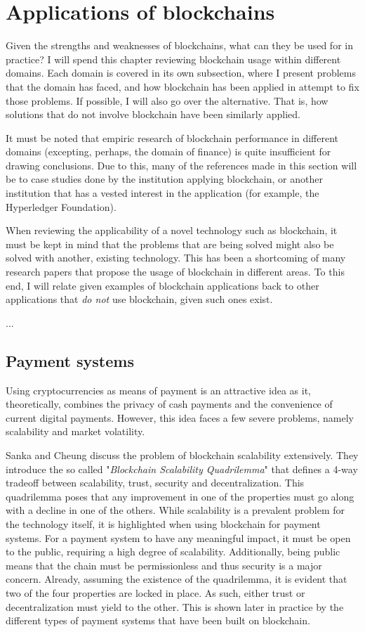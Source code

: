 \section{Applications of blockchains}

Given the strengths and weaknesses of blockchains, what can they be
used for in practice? I will spend this chapter reviewing blockchain
usage within different domains. Each domain is covered in its own
subsection, where I present problems that the domain has faced, and
how blockchain has been applied in attempt to fix those problems. If
possible, I will also go over the alternative. That is, how solutions
that do not involve blockchain have been similarly applied. 

It must be noted that empiric research of blockchain performance in
different domains (excepting, perhaps, the domain of finance) is quite
insufficient for drawing conclusions. Due to this, many of the
references made in this section will be to case studies done by the
institution applying blockchain, or another institution that has a
vested interest in the application (for example, the Hyperledger
Foundation).

When reviewing the applicability of a novel technology such as
blockchain, it must be kept in mind that the problems that are being
solved might also be solved with another, existing technology. This
has been a shortcoming of many research papers that propose the usage
of blockchain in different areas. To this end, I will relate given
examples of blockchain applications back to other applications that
\textit{do not} use blockchain, given such ones exist.

...

\subsection{Payment systems}

Using cryptocurrencies as means of payment is an attractive idea as
it, theoretically, combines the privacy of cash payments and the
convenience of current digital payments. However, this idea faces a
few severe problems, namely scalability and market volatility.

Sanka and Cheung \cite{sankaScalability} discuss the problem of
blockchain scalability extensively. They introduce the so called
"\textit{Blockchain Scalability Quadrilemma}" that defines a 4-way
tradeoff between scalability, trust, security and decentralization.
This quadrilemma poses that any improvement in one of the properties
must go along with a decline in one of the others. While scalability
is a prevalent problem for the technology itself, it is highlighted
when using blockchain for payment systems. For a payment system to
have any meaningful impact, it must be open to the public, requiring a
high degree of scalability. Additionally, being public means that the
chain must be permissionless and thus security is a major concern.
Already, assuming the existence of the quadrilemma, it is evident that
two of the four properties are locked in place. As such, either trust
or decentralization must yield to the other. This is shown later in
practice by the different types of payment systems that have been
built on blockchain.

